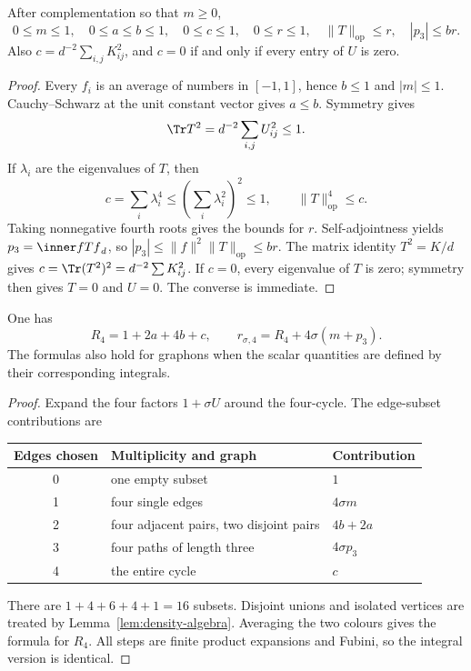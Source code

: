 \begin{lemma}
\label{lem:scalar-bounds}
\proved After complementation so that $m\ge0$,
\[
 0\le m\le1,\quad 0\le a\le b\le1,\quad 0\le c\le1,\quad
 0\le r\le1,\quad\|T\|_{\mathrm{op}}\le r,\quad |p_3|\le br.
\]
Also $c=d^{-2}\sum_{i,j}K_{ij}^2$, and $c=0$ if and only if every entry of $U$ is zero.
\end{lemma}
\begin{proof}
Every $f_i$ is an average of numbers in $[-1,1]$, hence $b\le1$ and $|m|\le1$.
Cauchy--Schwarz at the unit constant vector gives $a\le b$.  Symmetry gives
\[
 \Tr T^2=d^{-2}\sum_{i,j}U_{ij}^2\le1.
\]
If $\lambda_i$ are the eigenvalues of $T$, then
\[
 c=\sum_i\lambda_i^4\le\left(\sum_i\lambda_i^2\right)^2\le1,
 \qquad \|T\|_{\mathrm{op}}^4\le c.
\]
Taking nonnegative fourth roots gives the bounds for $r$.  Self-adjointness yields
$p_3=\inner f{Tf}_d$, so $|p_3|\le\|f\|^2\|T\|_{\mathrm{op}}\le br$.
The matrix identity $T^2=K/d$ gives
$c=\Tr(T^2)^2=d^{-2}\sum K_{ij}^2$.  If $c=0$, every eigenvalue of $T$ is zero; symmetry
then gives $T=0$ and $U=0$.  The converse is immediate.
\end{proof}

\begin{lemma}
\label{lem:fourth-traces}
\proved One has
\[
 R_4=1+2a+4b+c,\qquad
 r_{\sigma,4}=R_4+4\sigma(m+p_3).
\]
The formulas also hold for graphons when the scalar quantities are defined by their
corresponding integrals.
\end{lemma}
\begin{proof}
Expand the four factors $1+\sigma U$ around the four-cycle.  The edge-subset contributions
are
\begin{center}
\begin{tabular}{@{}cll@{}}
\toprule
Edges chosen & Multiplicity and graph & Contribution\\\midrule
0 & one empty subset & $1$\\
1 & four single edges & $4\sigma m$\\
2 & four adjacent pairs, two disjoint pairs & $4b+2a$\\
3 & four paths of length three & $4\sigma p_3$\\
4 & the entire cycle & $c$\\\bottomrule
\end{tabular}
\end{center}
There are $1+4+6+4+1=16$ subsets.  Disjoint unions and isolated vertices are treated by
Lemma~\ref{lem:density-algebra}.  Averaging the two colours gives the formula for $R_4$.
All steps are finite product expansions and Fubini, so the integral version is identical.
\end{proof}

